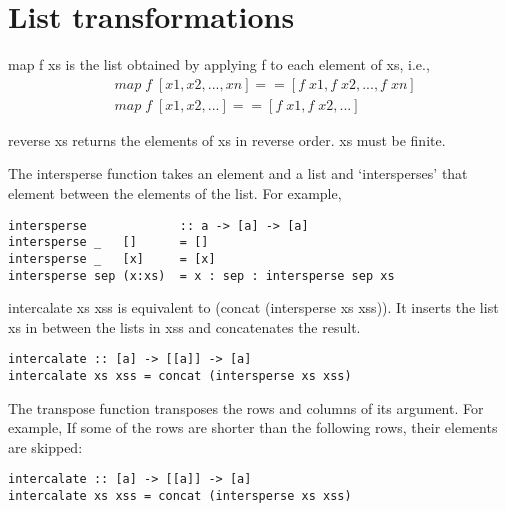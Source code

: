 \section{List transformations}

map f xs is the list obtained by applying f to each element of xs, i.e.,
\begin{align*}
	&map\; f\; [x1, x2, ..., xn] == [f\; x1, f\; x2, ..., f\; xn]\\
	&map\; f\; [x1, x2, ...] == [f\; x1, f\; x2, ...]
\end{align*}

reverse xs returns the elements of xs in reverse order. xs must be finite.

The intersperse function takes an element and a list and `intersperses' that element between the elements of the list. For example,

\begin{lstlisting}[frame=single]
intersperse             :: a -> [a] -> [a]
intersperse _   []      = []
intersperse _   [x]     = [x]
intersperse sep (x:xs)  = x : sep : intersperse sep xs
\end{lstlisting}

intercalate xs xss is equivalent to (concat (intersperse xs xss)). It inserts the list xs in between the lists in xss and concatenates the result.

\begin{lstlisting}[frame=single]
intercalate :: [a] -> [[a]] -> [a]
intercalate xs xss = concat (intersperse xs xss)
\end{lstlisting}

The transpose function transposes the rows and columns of its argument. For example,
If some of the rows are shorter than the following rows, their elements are skipped:

\begin{lstlisting}[frame=single]
intercalate :: [a] -> [[a]] -> [a]
intercalate xs xss = concat (intersperse xs xss)
\end{lstlisting}

